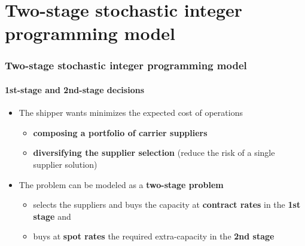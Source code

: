 \documentclass[,9pt,xcolor={dvipsnames}]{beamer} %
\begin{document}
\section{Two-stage stochastic integer programming model}
\begin{frame}%
	\frametitle{Two-stage stochastic integer programming model}
	\framesubtitle{1st-stage and 2nd-stage decisions}
	\begin{itemize}
		\item<1-> The shipper wants minimizes the expected cost of operations
		\medskip
		\begin{itemize}
			\item<1-> \textbf{composing a portfolio of carrier suppliers}
			\medskip
			\item<1-> \textbf{diversifying the supplier selection} (reduce the risk of a single supplier solution)
		\end{itemize}
		\bigskip
		\item<2-> The problem can be modeled as a \textbf{two-stage problem}
		\medskip
		\begin{itemize}
			\item<2-> selects the suppliers and buys the capacity at \textbf{\color{blue}contract rates} in the \textbf{1st stage} and
			\medskip
			\item<2-> buys at \textbf{\color{purple}spot rates} the required extra-capacity in the \textbf{2nd stage}%
		\end{itemize}
	\end{itemize}
\end{frame}
\end{document}

